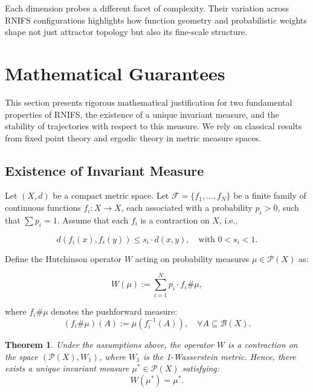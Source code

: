\documentclass[twocolumn,10pt]{article}
\newtheorem{theorem}{Theorem}
\begin{document}
Each dimension probes a different facet of complexity. Their variation across RNIFS configurations highlights how function geometry and probabilistic weights shape not just attractor topology but also its fine-scale structure.

\section{Mathematical Guarantees}
\label{sec:existence_stability}
\vspace{0.8em}

This section presents rigorous mathematical justification for two fundamental properties of  RNIFS, the existence of a unique invariant measure, and the stability of trajectories with respect to this measure. We rely on classical results from fixed point theory and ergodic theory in metric measure spaces.

\subsection{Existence of Invariant Measure}
\label{subsec:existence_measure}

Let $(X, d)$ be a compact metric space. Let $\mathcal{F} = \{f_1, \dots, f_N\}$ be a finite family of continuous functions $f_i: X \to X$, each associated with a probability $p_i > 0$, such that $\sum p_i = 1$. Assume that each $f_i$ is a contraction on $X$, i.e.,

\begin{equation}
d(f_i(x), f_i(y)) \leq s_i \cdot d(x, y), \quad \text{with } 0 < s_i < 1.
\label{eq:contraction2}
\end{equation}

Define the Hutchinson operator $W$ acting on probability measures $\mu \in \mathcal{P}(X)$ as:

\begin{equation}
W(\mu) := \sum_{i=1}^N p_i \cdot f_i\#\mu,
\label{eq:hutchinson_operator2}
\end{equation}

where $f_i\#\mu$ denotes the pushforward measure:
\[
(f_i\#\mu)(A) := \mu(f_i^{-1}(A)), \quad \forall A \subseteq \mathcal{B}(X).
\]

\begin{theorem}
\label{thm:invariant_measure}
Under the assumptions above, the operator $W$ is a contraction on the space $(\mathcal{P}(X), W_1)$, where $W_1$ is the 1-Wasserstein metric. Hence, there exists a unique invariant measure $\mu^* \in \mathcal{P}(X)$ satisfying:
\[
W(\mu^*) = \mu^*.
\]
\end{theorem}
\end{document}
